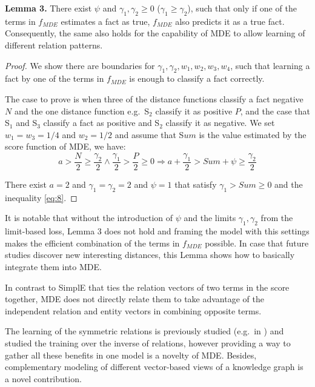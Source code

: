 \documentclass{ecai}
\begin{document}
\textbf{Lemma 3.} There exist $\psi$ and $\gamma_1, \gamma_2 \ge 0$ ($\gamma_1 \ge \gamma_2$), such that only if one of the terms in $f_{MDE}$ estimates a fact as true, $f_{MDE}$ also predicts it as a true fact. Consequently, the same also holds for the capability of MDE to allow learning of different relation patterns.

\begin{proof} We show there are boundaries for $\gamma_1, \gamma_2, w_1, w_2, w_3, w_4$, such that learning a fact by one of the terms in $f_{MDE}$ is enough to classify a fact correctly. 

The case to prove is when three of the distance functions classify a fact negative $N$ and the one distance function e.g.\ S$_2$ classify it as positive $P$, and the case that S$_1$ and S$_3$ classify a fact as positive and S$_2$ classify it as negative. We set $w_1 = w_3 = 1/4$ and  $w_2  = 1/2$ and assume that S$um$ is the value estimated by the score function of MDE, we have:
\begin{equation}\label{eq:8}
a > \frac{N}{2} \ge \frac{\gamma_2}{2} \wedge \frac{\gamma_1}{2} > \frac{P}{2} \ge 0  \Rightarrow a + \frac{\gamma_1}{2} > Sum + \psi \ge \frac{\gamma_2}{2}  
\end{equation}


There exist $a= 2$ and $\gamma_1 = \gamma_2= 2$ and $\psi = 1$ that satisfy $\gamma_1 > Sum  \ge 0 $ and the inequality \ref{eq:8}.
\end{proof}
It is notable that without the introduction of $\psi$ and the limits $\gamma_1, \gamma_2$ from the limit-based loss, Lemma 3 does not hold and framing the model with this settings makes the efficient combination of the terms in $f_{MDE}$ possible. In case that future studies discover new interesting distances, this Lemma shows how to basically integrate them into MDE.

In contrast to SimplE that ties the relation vectors of two terms in the score together, MDE does not directly relate them to take advantage of the independent relation and entity vectors in combining opposite terms.

The learning of the symmetric relations is previously studied (e.g.\ in \cite{yang2014embedding,sun2019rotate}) and \cite{lin2015modeling} studied the training over the inverse of relations, however providing a way to gather all these benefits in one model is a novelty of MDE. Besides, complementary modeling of different vector-based views of a knowledge graph is a novel contribution. 
\end{document}
